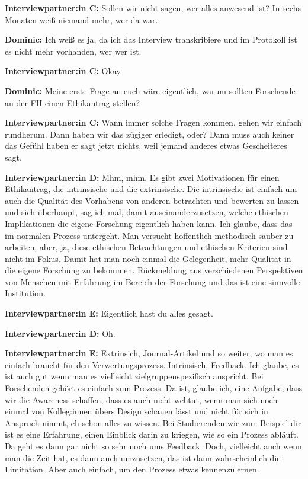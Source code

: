 \documentclass[a4paper,12pt,twoside]{scrreprt}
\begin{document}
\textbf{Interviewpartner:in C:} Sollen wir nicht sagen, wer alles anwesend ist? In sechs Monaten weiß niemand mehr, wer da war.

\textbf{Dominic:} Ich weiß es ja, da ich das Interview transkribiere und im Protokoll ist es nicht mehr vorhanden, wer wer ist.

\textbf{Interviewpartner:in C:} Okay.

\textbf{Dominic:} Meine erste Frage an euch wäre eigentlich, warum sollten Forschende an der FH einen Ethikantrag stellen?

\textbf{Interviewpartner:in C:} Wann immer solche Fragen kommen, gehen wir einfach rundherum. Dann haben wir das zügiger erledigt, oder? Dann muss auch keiner das Gefühl haben er sagt jetzt nichts, weil jemand anderes etwas Gescheiteres sagt.

\textbf{Interviewpartner:in D:} Mhm, mhm. Es gibt zwei Motivationen für einen Ethikantrag, die intrinsische und die extrinsische. Die intrinsische ist einfach um auch die Qualität des Vorhabens von anderen betrachten und bewerten zu lassen und sich überhaupt, sag ich mal, damit auseinanderzusetzen, welche ethischen Implikationen die eigene Forschung eigentlich haben kann. Ich glaube, dass das im normalen Prozess untergeht. Man versucht hoffentlich methodisch sauber zu arbeiten, aber, ja, diese ethischen Betrachtungen und ethischen Kriterien sind nicht im Fokus. Damit hat man noch einmal die Gelegenheit, mehr Qualität in die eigene Forschung zu bekommen. Rückmeldung aus verschiedenen Perspektiven von Menschen mit Erfahrung im Bereich der Forschung und das ist eine sinnvolle Institution.

\textbf{Interviewpartner:in E:} Eigentlich hast du alles gesagt.

\textbf{Interviewpartner:in D:} Oh.

\textbf{Interviewpartner:in E:} Extrinsich, Journal-Artikel und so weiter, wo man es einfach braucht für den Verwertungsprozess. Intrinsisch, Feedback. Ich glaube, es ist auch gut wenn man es vielleicht zielgruppenspezifisch anspricht. Bei Forschenden gehört es einfach zum Prozess. Da ist, glaube ich, eine Aufgabe, dass wir die Awareness schaffen, dass es auch nicht wehtut, wenn man sich noch einmal von Kolleg:innen übers Design schauen lässt und nicht für sich in Anspruch nimmt, eh schon alles zu wissen. Bei Studierenden wie zum Beispiel dir ist es eine Erfahrung, einen Einblick darin zu kriegen, wie so ein Prozess abläuft. Da geht es dann gar nicht so sehr noch ums Feedback. Doch, vielleicht auch wenn man die Zeit hat, es dann auch umzusetzen, das ist dann wahrscheinlich die Limitation. Aber auch einfach, um den Prozess etwas kennenzulernen.
\end{document}
